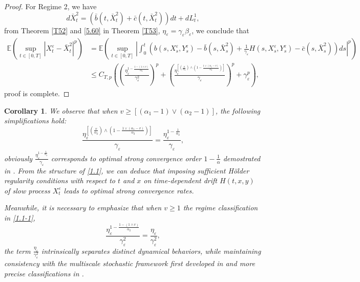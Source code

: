 \documentclass[11pt,reqno]{amsart}
\newtheorem{corollary}{\indent Corollary}[section]
\numberwithin{equation}{section}
\begin{document}
\begin{proof}
	
	For Regime 2,  we have 
	\begin{equation}\label{7.8}
		d\bar{X}^{2}_{t}=(\bar{b}(t,\bar{X}^{2}_{t})+\bar{c}(t,\bar{X}^{2}_{t}))dt+dL_{t}^{1},
	\end{equation}
from Theorem \ref{T52} and \eqref{5.60} in Theorem \ref{T53},  $\eta_{\varepsilon}=\gamma_{\varepsilon}\beta_{\varepsilon}$, we conclude that 
	\begin{equation}\label{7.10}
		\begin{split}
			\mathbb{E}\left( \sup_{t\in [0,T]}|X_{t}^{\varepsilon}-\bar{X}^{2}_{t}|^{p}\right)&=\mathbb{E}\left( \sup_{t\in [0,T]}\left| \int_{0}^{t}\left( b(s,X_{s}^{\varepsilon},Y_{s}^{\varepsilon})-\bar{b}(s,\bar{X}^{2}_{s})+ \frac{1}{\gamma_{\varepsilon}}H(s,X_{s}^{\varepsilon},Y_{s}^{\varepsilon})-\bar{c}(s,\bar{X}^{2}_{s})\right) ds\right| ^{p}\right)\\
			&\leq  C_{T,p}\left(                                                                                                                                                                                                                                                                           \left(  \frac{\eta_{\varepsilon}^{1-\frac{1-(1\wedge v)}{\alpha_{2}}}}{\gamma_{\varepsilon}^{2}}\right) ^{p}+ \left(  \frac{\eta_{\varepsilon}^{\left[ \left( \frac{v}{\alpha_{2}}\right) \wedge \left( 1-\frac{1\vee(\alpha_{1}-v)}{\alpha_{2}}\right) \right] }}{\gamma_{\varepsilon} } \right) ^{p}+\gamma_{\varepsilon}^{p}\right),
		\end{split}\nonumber
	\end{equation}
proof is complete.
\end{proof}

	\begin{corollary}\label{c71}
We observe that when $v\geq[(\alpha_{1}-1)\vee (\alpha_{2}-1)]$, the following simplifications hold:
$$\dfrac{\eta_{\varepsilon}^{\left[ \left( \frac{v}{\alpha_{2}}\right) \wedge \left( 1-\frac{1\vee(\alpha_{1}-v)}{\alpha_{2}}\right) \right] }}{\gamma_{\varepsilon} } =\dfrac{\eta_{\varepsilon}^{1-\frac{1}{\alpha_{2}}}}{\gamma_{\varepsilon} },$$
 obviously $\frac{\eta_{\varepsilon}^{1-\frac{1}{\alpha_{2}}}}{\gamma_{\varepsilon} } $ corresponds to optimal strong convergence order $1-\frac{1}{\alpha}$ %
 demostrated in \cite{SXX}. From the structure of \eqref{1.1}, we can deduce that imposing sufficient H\"{o}lder regularity conditions with respect to $t$ and $x$ on time-dependent drift $H(t,x,y)$ of slow process $X_{t}^{\varepsilon}$ leads to optimal strong convergence rates.

Meanwhile, it is necessary to emphasize that when $v\geq1$ the regime classification in \eqref{1.1-1},
$$ \frac{\eta_{\varepsilon}^{1-\frac{1-(1\wedge v)}{\alpha_{2}}}}{\gamma_{\varepsilon}^{2}}= \frac{\eta_{\varepsilon}}{\gamma_{\varepsilon}^{2}},$$ 
the term $ \frac{\eta_{\varepsilon}}{\gamma_{\varepsilon}^{2}}$ intrinsically separates distinct dynamical behaviors, while maintaining consistency with the multiscale stochastic framework first developed in \cite{EY2,EY3} and  more precise classifications in \cite{RX}.
	\end{corollary}
\end{document}
